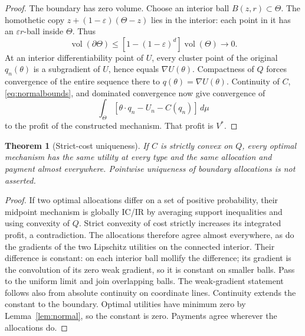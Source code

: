 \documentclass[11pt,a4paper]{article}
\numberwithin{equation}{section}
\newtheorem{theorem}{Theorem}
\DeclareMathOperator{\vol}{vol}
\begin{document}
\begin{proof}
The boundary has zero volume. Choose an interior ball \(B(z,r)\subset\Theta\).
The homothetic copy \(z+(1-\varepsilon)(\Theta-z)\) lies in the interior:
each point in it has an \(\varepsilon r\)-ball inside \(\Theta\).
Thus
\[
 \vol(\partial\Theta)
 \le[1-(1-\varepsilon)^d]\vol(\Theta)\longrightarrow0.
\]
At an interior differentiability point of \(U\), every cluster point of
the original \(q_n(\theta)\) is a subgradient of \(U\), hence equals
\(\nabla U(\theta)\). Compactness of \(Q\) forces convergence of the
entire sequence there to \(q(\theta)=\nabla U(\theta)\).
Continuity of \(C\), \eqref{eq:normalbounds}, and dominated convergence
now give convergence of
\[
 \int_\Theta[\theta\cdot q_n-U_n-C(q_n)]\,d\mu
\]
to the profit of the constructed mechanism. That profit is \(V^*\).
\end{proof}

\begin{theorem}[Strict-cost uniqueness]\label{thm:unique}
If \(C\) is strictly convex on \(Q\), every optimal mechanism has the
same utility at every type and the same allocation and payment almost
everywhere. Pointwise uniqueness of boundary allocations is not asserted.
\end{theorem}
\begin{proof}
If two optimal allocations differ on a set of positive probability,
their midpoint mechanism is globally IC/IR by averaging support
inequalities and using convexity of \(Q\). Strict convexity of cost
strictly increases its integrated profit, a contradiction.
The allocations therefore agree almost everywhere, as do the gradients
of the two Lipschitz utilities on the connected interior.
Their difference is constant: on each interior ball mollify the
difference; its gradient is the convolution of its zero weak gradient,
so it is constant on smaller balls. Pass to the uniform limit and join
overlapping balls. The weak-gradient statement follows also from
absolute continuity on coordinate lines. Continuity extends the
constant to the boundary. Optimal utilities have minimum zero by
Lemma~\ref{lem:normal}, so the constant is zero. Payments agree
wherever the allocations do.
\end{proof}
\end{document}
